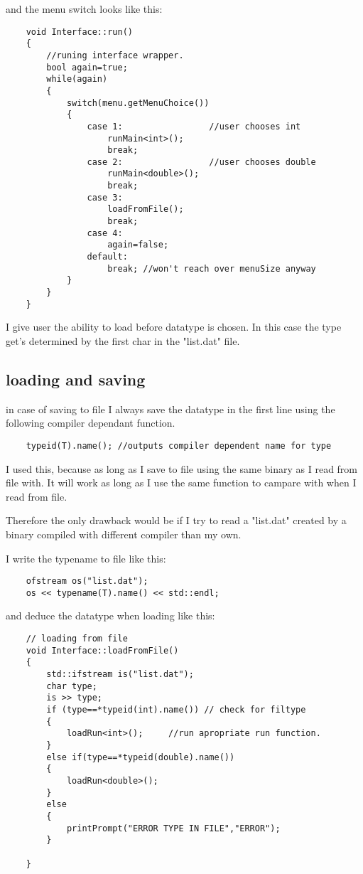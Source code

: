 \documentclass[11pt]{article}
\begin{document}
and the menu switch looks like this:

\begin{lstlisting}
	void Interface::run()
	{
		//runing interface wrapper.
		bool again=true;
		while(again)
		{
			switch(menu.getMenuChoice())
			{
				case 1:                 //user chooses int
					runMain<int>();
					break;
				case 2:                 //user chooses double
					runMain<double>();	
					break;
				case 3:
					loadFromFile();
					break;
				case 4:
					again=false;
				default:
					break; //won't reach over menuSize anyway
			}
		}
	}\end{lstlisting}

I give user the ability to load before datatype is chosen. In this case the type get's determined by the first char in the "list.dat" file.

\subsection{loading and saving}
	in case of saving to file I always save the datatype in the first line using the following compiler dependant function.
\begin{lstlisting}
	typeid(T).name(); //outputs compiler dependent name for type
\end{lstlisting}

I used this, because as long as I save to file using the same binary as I read from file with. It will work as long as I use the same function to campare with when I read from file.

Therefore the only drawback would be if I try to read a "list.dat" created by a binary compiled with different compiler than my own.

I write the typename to file like this:

\begin{lstlisting}
	ofstream os("list.dat");
	os << typename(T).name() << std::endl;
\end{lstlisting}

and deduce the datatype when loading like this:

\begin{lstlisting}
	// loading from file
	void Interface::loadFromFile()
	{
		std::ifstream is("list.dat");
		char type;
		is >> type;
		if (type==*typeid(int).name()) // check for filtype
		{
			loadRun<int>();     //run apropriate run function.
		}
		else if(type==*typeid(double).name())
		{
			loadRun<double>();
		}
		else
		{
			printPrompt("ERROR TYPE IN FILE","ERROR");
		}
	
	}
\end{lstlisting}
 
\end{document}
